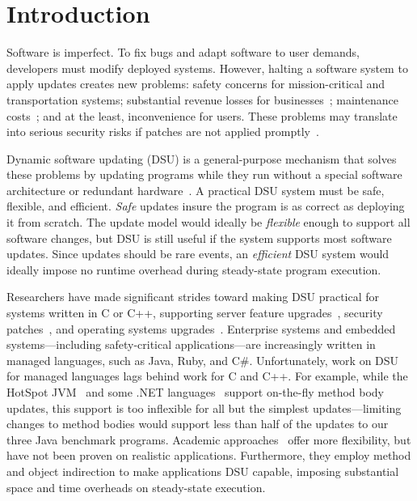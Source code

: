 
\section{Introduction}

Software is imperfect.  To fix bugs and adapt software to user
demands, developers must modify deployed systems.  However, halting a
software system to apply updates creates new problems: safety concerns
for mission-critical and transportation systems; substantial revenue
losses for businesses~\cite{gartner98downtime,roc1}; maintenance
costs~\cite{zorn05}; and at the least, inconvenience for users. These
problems may translate into serious security risks if patches are not
applied promptly~\cite{altekar05opus,ksplice}.  

Dynamic software updating (DSU) is a general-purpose mechanism that
solves these problems by updating programs while they run without a
special software architecture or redundant
hardware~\cite{kspliceslashdot08}. A practical DSU system must be safe,
flexible, and efficient.  \emph{Safe} updates insure the program is as
correct as deploying it from scratch.  The update model would ideally
be \emph{flexible} enough to support all software changes, but DSU is
still useful if the system supports most software updates.  Since
updates should be rare events, an \emph{efficient} DSU system would
ideally impose no 
runtime overhead during steady-state program execution.

Researchers have made significant strides toward making DSU practical
for systems written in C or C++, supporting server feature
upgrades~\cite{neamtiu06dsu,chen:icse07,upstare}, security
patches~\cite{altekar05opus}, and operating systems
upgrades~\cite{K42reconfig,k42usenix,baumann07reboots,dynamos_eurosys_07,chen06vee,ksplice}.
Enterprise systems and embedded systems---including safety-critical
applications---are increasingly written in managed languages, such as
Java, Ruby, and C\#.  Unfortunately, work on DSU for managed languages
lags behind work for C and C++.  For example, while the HotSpot
JVM~\cite{JVMhotswap} and some .NET languages~\cite{VSEnC} support
on-the-fly method body updates, this support is too inflexible for all
but the simplest updates---limiting changes to method bodies would
support less than half of the updates
to our three Java benchmark programs.  Academic
approaches~\cite{ritzau00dynamic,Mala00a,orso:java,bierman08upgradej} offer more
flexibility, but have not been proven on realistic applications.
Furthermore, they employ method
and object indirection to make applications DSU capable, imposing substantial space
and time overheads on steady-state execution.

